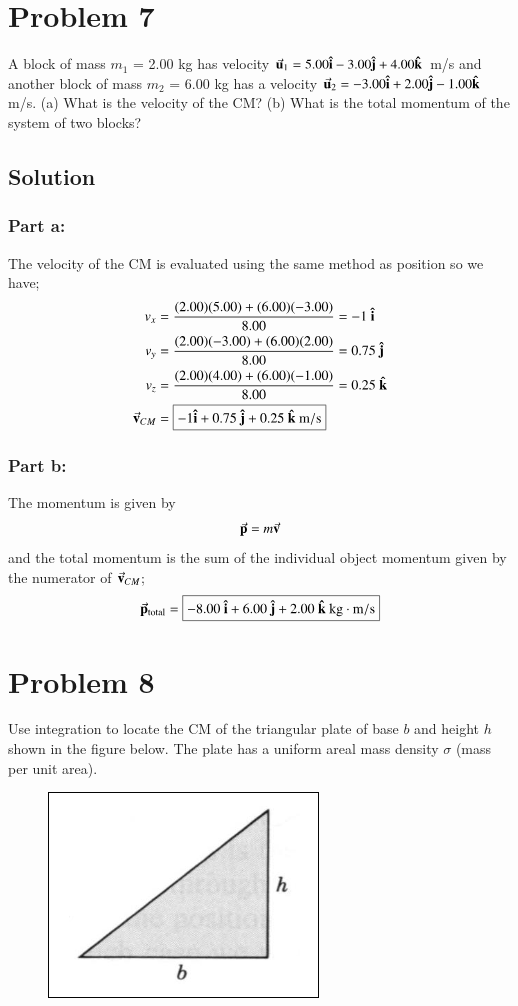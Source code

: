 \documentclass{article}
\begin{document}
\section*{Problem 7}
A block of mass $m_1$ = 2.00 kg has velocity $\va{u}_1 = 5.00 \vu{i} - 3.00 \vu{j} + 4.00 \vu{k}$ m/s and another block of mass
$m_2$ = 6.00 kg has a velocity $\va{u}_2 = -3.00 \vu{i} + 2.00 \vu{j} - 1.00 \vu{k}$ m/s. (a) What is the velocity of the CM? (b)
What is the total momentum of the system of two blocks?

\subsection*{Solution}
\subsubsection*{Part a:}
The velocity of the CM is evaluated using the same method as position so we have;
\begin{align*}
	v_x &= \frac{(2.00)(5.00) + (6.00)(-3.00)}{8.00} = -1\ \vu i \\
	v_y &= \frac{(2.00)(-3.00) + (6.00)(2.00)}{8.00} = 0.75\ \vu j \\
	v_z &= \frac{(2.00)(4.00) + (6.00)(-1.00)}{8.00} = 0.25\ \vu k \\
	\va v_{CM} &= \boxed{-1 \vu i + 0.75\ \vu j + 0.25\ \vu k \ \text{m}/\text{s}}
\end{align*}

\subsubsection*{Part b:}
The momentum is given by
\[
	\va p = m \va v
\]
and the total momentum is the sum of the individual object momentum given by the numerator of $\va v_{CM}$;
\[
	\va p_{\text{total}} = \boxed{-8.00\ \vu i + 6.00\ \vu j + 2.00\ \vu k \ \text{kg}\cdot\text{m}/\text{s}}
\]

\section*{Problem 8}
Use integration to locate the CM of the triangular plate of base $b$ and height $h$ shown in the figure below.
The plate has a uniform areal mass density $\sigma$ (mass per unit area).

\begin{figure}[ht]
    \centering
    \includegraphics[scale=.5]{drawing-4.png}
\end{figure}
\end{document}
